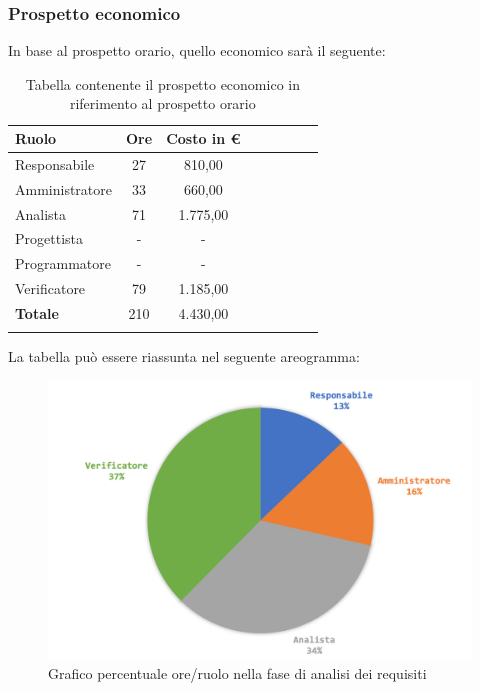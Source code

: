 			\subsubsection{Prospetto economico}
			In base al prospetto orario, quello economico sarà il seguente: 
			
			\begin{longtable}{|l|c|c|c|c|c|c|c|}
				\hline
				\rowcolor{lighter-grayer}
				\textbf{Ruolo} & \textbf{Ore} & \textbf{Costo in €} \\
				\hline
				\endfirsthead
				
				\hline
				Responsabile & 27 & 810,00\\
				\hline
				\hline
				Amministratore & 33 & 660,00\\
				\hline
				\hline
				Analista & 71 & 1.775,00\\
				\hline
				\hline
				Progettista & - & -\\
				\hline
				\hline
				Programmatore & - & -\\
				\hline
				\hline
				Verificatore & 79 & 1.185,00\\
				\hline
				\textbf{Totale} & 210 & 4.430,00\\
				\hline
				\caption{Tabella contenente il prospetto economico in riferimento al prospetto orario}
			\end{longtable}
			\pagebreak
		
			La tabella può essere riassunta nel seguente areogramma:
			\begin{figure}[H]
				\centering
				\includegraphics[width=0.8\linewidth]{./images/preventivo/analisi2.png}
				\caption{Grafico percentuale ore/ruolo nella fase di analisi dei requisiti}
				\label{fig:grafico costi ruolo fase analisi dei requisiti}
			\end{figure}
		
